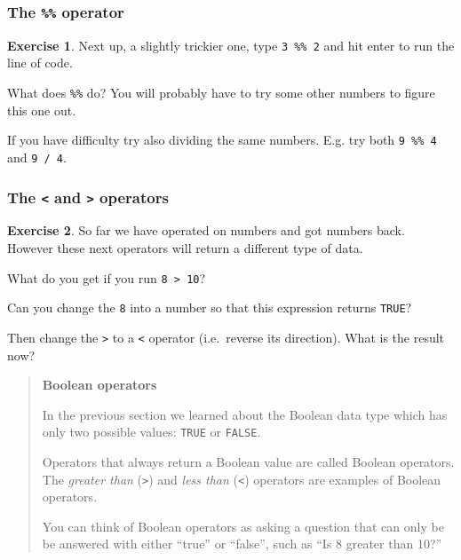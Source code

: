 \documentclass[
]{article}
\theoremstyle{definition}
\theoremstyle{definition}
\theoremstyle{definition}
\newtheorem{exercise}{Exercise}[section]
\theoremstyle{definition}
\theoremstyle{remark}
\begin{document}
\hypertarget{the-operator-3}{%
\subsubsection{\texorpdfstring{The \texttt{\%\%} operator}{The \%\% operator}}\label{the-operator-3}}

\begin{exercise}
Next up, a slightly trickier one, type \texttt{3\ \%\%\ 2} and hit enter to run the line of code.

What does \texttt{\%\%} do? You will probably have to try some other numbers to figure
this one out.

If you have difficulty try also dividing the same numbers. E.g. try both
\texttt{9\ \%\%\ 4} and \texttt{9\ /\ 4}.
\end{exercise}

\hypertarget{the-and-operators}{%
\subsubsection{\texorpdfstring{The \texttt{\textless{}} and \texttt{\textgreater{}} operators}{The \textless{} and \textgreater{} operators}}\label{the-and-operators}}

\begin{exercise}
So far we have operated on numbers and got numbers back. However these next
operators will return a different type of data.

What do you get if you run \texttt{8\ \textgreater{}\ 10}?

Can you change the \texttt{8} into a number so that this expression returns \texttt{TRUE}?

Then change the \texttt{\textgreater{}} to a \texttt{\textless{}} operator (i.e.~reverse its direction).
What is the result now?
\end{exercise}

\begin{quote}
\textbf{Boolean operators}

In the previous section we learned about the Boolean data type which has only
two possible values: \texttt{TRUE} or \texttt{FALSE}.

Operators that always return a Boolean value are called Boolean operators.
The \emph{greater than} (\texttt{\textgreater{}}) and \emph{less than} (\texttt{\textless{}}) operators are examples of
Boolean operators.

You can think of Boolean operators as asking a question that can only be
be answered with either ``true'' or ``false'', such as ``Is 8 greater than 10?''
\end{quote}
\end{document}
